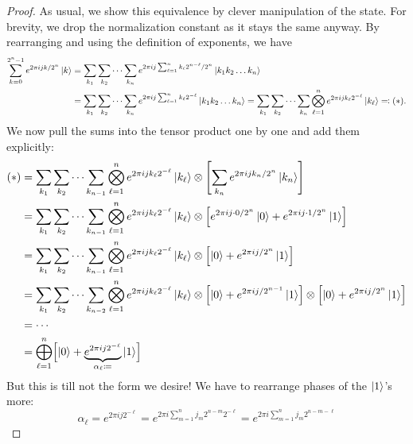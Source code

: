 			\begin{proof}
				As usual, we show this equivalence by clever manipulation of the state. For brevity, we drop the normalization constant as it stays the same anyway. By rearranging and using the definition of exponents, we have
				\begin{align}
					\sum_{k = 0}^{2^n - 1} e^{2 \pi i j k / 2^n} \ket{k}
						&= \sum_{k_1} \sum_{k_2} \dots \sum_{k_n} e^{2 \pi i j \sum_{\ell = 1}^{n} k_\ell 2^{n - \ell} / 2^n} \ket{k_1 k_2 \dots k_n} \\
						&= \sum_{k_1} \sum_{k_2} \dots \sum_{k_n} e^{2 \pi i j \sum_{\ell = 1}^{n} k_\ell 2^{-\ell}} \ket{k_1 k_2 \dots k_n}
						 = \sum_{k_1} \sum_{k_2} \dots \sum_{k_n} \bigotimes_{\ell = 1}^{n} e^{2 \pi i j k_\ell 2^{-\ell}} \ket{k_\ell} \eqqcolon (\ast).
				\end{align}
				We now pull the sums into the tensor product one by one and add them explicitly:
				\begin{align}
					(\ast)
						&= \sum_{k_1} \sum_{k_2} \dots \sum_{k_{n - 1}} \bigotimes_{\ell = 1}^{n} e^{2 \pi i j k_\ell 2^{-\ell}} \ket{k_\ell} \otimes \Biggl[ \sum_{k_n} e^{2 \pi i j k_n / 2^n} \ket{k_n} \Biggr] \\
						&= \sum_{k_1} \sum_{k_2} \dots \sum_{k_{n - 1}} \bigotimes_{\ell = 1}^{n} e^{2 \pi i j k_\ell 2^{-\ell}} \ket{k_\ell} \otimes \Bigl[ e^{2 \pi i j \cdot 0 / 2^n} \ket{0} + e^{2 \pi i j \cdot 1 / 2^n} \ket{1} \Bigr] \\
						&= \sum_{k_1} \sum_{k_2} \dots \sum_{k_{n - 1}} \bigotimes_{\ell = 1}^{n} e^{2 \pi i j k_\ell 2^{-\ell}} \ket{k_\ell} \otimes \Bigl[ \ket{0} + e^{2 \pi i j / 2^n} \ket{1} \Bigr] \\
						&= \sum_{k_1} \sum_{k_2} \dots \sum_{k_{n - 2}} \bigotimes_{\ell = 1}^{n} e^{2 \pi i j k_\ell 2^{-\ell}} \ket{k_\ell} \otimes \Bigl[ \ket{0} + e^{2 \pi i j / 2^{n - 1}} \ket{1} \Bigr] \otimes \Bigl[ \ket{0} + e^{2 \pi i j / 2^n} \ket{1} \Bigr] \\
						&= \cdots \\
						&= \bigoplus_{\ell = 1}^{n} \Bigl[ \ket{0} + \underbrace{e^{2 \pi i j 2^{-\ell}}}_{\alpha_\ell \coloneqq} \ket{1} \Bigr]
				\end{align}
				But this is till not the form we desire! We have to rearrange phases of the \(\ket{1}\)'s more:
				\begin{equation}
					\alpha_\ell
						= e^{2 \pi i j 2^{-\ell}}
						= e^{2 \pi i \sum_{m = 1}^{n} j_m 2^{n - m} 2^{-\ell}}
						= e^{2 \pi i \sum_{m = 1}^{n} j_m 2^{n - m - \ell}}

\end{equation}
\end{proof}
